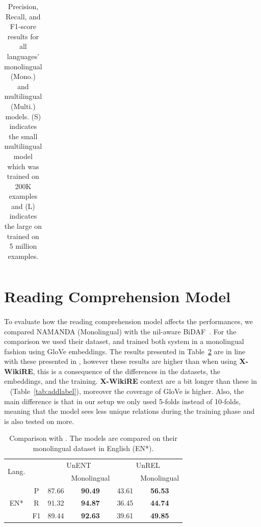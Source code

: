 \begin{table}[h]
\begin{tabular}{c|c|ccc|cc}
    \bottomrule
    \end{tabular}
      \caption{Precision, Recall, and F1-score results for all languages' monolingual (Mono.) and multilingual (Multi.) models. (S) indicates the small multilingual model which was trained on 200K examples and (L) indicates the large on trained on 5 million examples.}
  \label{table:bigtable}
\end{table}


\section{Reading Comprehension Model}
\paragraph{}
To evaluate how the reading comprehension model affects the performances, we compared NAMANDA (Monolingual) with the nil-aware BiDAF~\citep{levy2017zero}. For the comparison we used their dataset, and trained both system in a monolingual fashion using GloVe embeddings. The results presented in Table~\ref{table:comparison} are in line with these presented in \citep{kundu2018namanda}, however these results are higher than when using \textbf{X-WikiRE}, this is a consequence of the differences in the datasets, the embeddings, and the training. \textbf{X-WikiRE} context are a bit longer than these in ~\cite{levy2017zero} (Table~\ref{tab:addlabel}), moreover the coverage of GloVe is higher. Also, the main difference is that in our setup we only used 5-folds instead of 10-folds, meaning that the model sees less unique relations during the training phase and is also tested on more.   


\begin{table}[h!]
\fontsize{10}{10}\selectfont
  \centering
    \begin{tabular}{c|c|cc|cc}
    \toprule
    \multirow{2}{*}{Lang.} & &  \multicolumn{2}{c|}{UnENT} & \multicolumn{2}{c}{UnREL} \\

     &  &  \cite{levy2017zero} & Monolingual &  \cite{levy2017zero} & Monolingual \\
     \midrule
     
    \multirow{3}{*}{EN*} & P  & 87.66 & \textbf{90.49} & 43.61 & \textbf{56.53} \\
                         & R  & 91.32 & \textbf{94.87} & 36.45 & \textbf{44.74} \\
                         & F1 & 89.44 & \textbf{92.63} & 39.61 & \textbf{49.85} \\


    \bottomrule
    \end{tabular}
      \caption{Comparison with \cite{levy2017zero}. The models are compared on their monolingual dataset in English (EN*).}
  \label{table:comparison}
\end{table}

